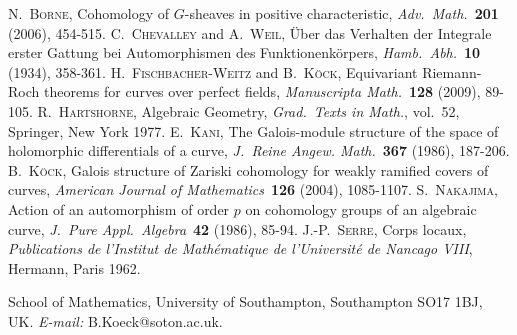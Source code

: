 \documentclass[12pt,leqno]{article}
\begin{document}
\begin{thebibliography}{FWK}
 \textsc{N.~Borne}, Cohomology of
    $G$-sheaves in positive characteristic, \textit{Adv.\ Math.}~\textbf{201} (2006),
    454-515.
 \textsc{C.~Chevalley} and \textsc{A.~Weil},
    \"Uber
    das
    Verhalten der Integrale erster Gattung bei Automorphismen
    des Funktionenk\"orpers, \textit{Hamb.\ Abh.}~\textbf{10} (1934),
    358-361.
 \textsc{H.~Fischbacher-Weitz} and
    \textsc{B.~K\"ock}, Equivariant Riemann-Roch theorems for
    curves over perfect fields, \textit {Manuscripta
    Math.}~\textbf{128} (2009), 89-105.
 \textsc{R.~Hartshorne}, Algebraic
    Geometry, \textit{Grad.\ Texts in Math.}, vol.~52, Springer, New York 1977.
 \textsc{E.~Kani}, The Galois-module structure
    of the space of holomorphic differentials of a curve,
    \textit{J.\ Reine Angew. Math.}~\textbf{367} (1986),
    187-206.
 \textsc{B.~K\"ock}, Galois
    structure  of
    Zariski cohomology for weakly ramified covers of curves,
    \textit{American Journal of Mathematics}~\textbf{126} (2004),
    1085-1107.
 \textsc{S.\ Nakajima}, Action of an
    automorphism of order $p$ on cohomology groups of an
    algebraic curve, \textit{J.\ Pure Appl.\ Algebra}~\textbf{42}
    (1986), 85-94.
 \textsc{J.-P.~Serre}, Corps locaux, \textit{
    Publications de l'Institut de Math\'ematique de l'Universit\'e de
  Nancago VIII}, Hermann, Paris 1962.
\end{thebibliography}

\bigskip

\bigskip


School of Mathematics, University of Southampton, Southampton
SO17 1BJ, UK. {\em E-mail:} B.Koeck@soton.ac.uk.
\end{document}
